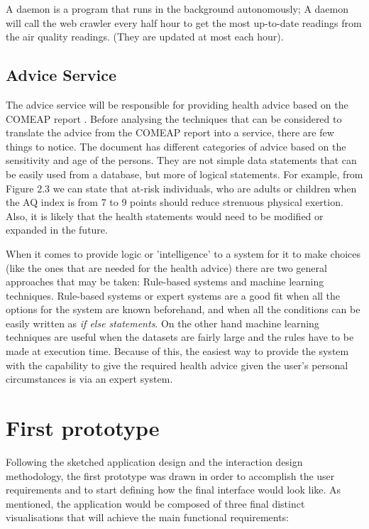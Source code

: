 A daemon is a program that runs in the background autonomously; A daemon will call the web crawler every half hour to get the most up-to-date readings from the air quality readings. (They are updated at most each hour). 

\subsection{Advice Service}
The advice service will be responsible for providing health advice based on the COMEAP report \cite{HealthProtectionAgencyfortheCommitteeontheMedicalEffectsofAirPollutants2011}. Before analysing the techniques that can be considered to translate the advice from the COMEAP report into a service, there are few things to notice. The document has different categories of advice based on the sensitivity and age of the persons. They are not simple data statements that can be easily used from a database, but more of logical statements. For example, from Figure 2.3 we can state that at-risk individuals, who are adults or children when the AQ index is from 7 to 9 points should reduce strenuous physical exertion. Also, it is likely that the health statements would need to be modified or expanded in the future. 

When it comes to provide logic or 'intelligence' to a system for it to make choices (like the ones that are needed for the health advice) there are two general approaches that may be taken: Rule-based systems and machine learning techniques. Rule-based systems or expert systems are a good fit when all the options for the system are known beforehand, and when all the conditions can be easily written as \textit{if else statements}. On the other hand machine learning techniques are useful when the datasets are fairly large and the rules have to be made at execution time. Because of this, the easiest way to provide the system with the capability to give the required health advice given the user's personal circumstances is via an expert system.

\section{First prototype}
Following the sketched application design and the interaction design methodology, the first prototype was drawn in order to accomplish the user requirements and to start defining how the final interface would look like. As mentioned, the application would be composed of three final distinct visualisations that will achieve the main functional requirements:

